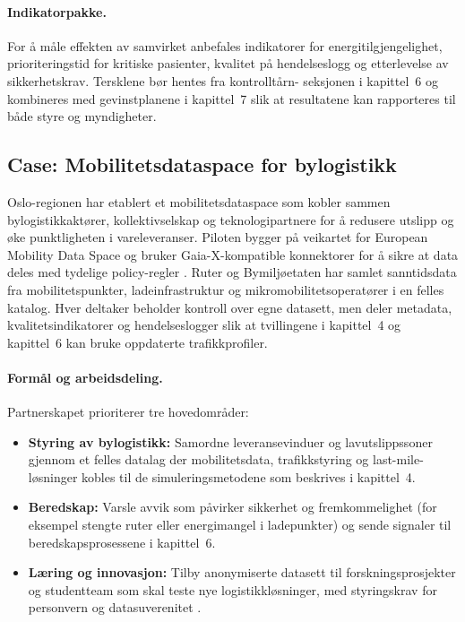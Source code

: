 \paragraph{Indikatorpakke.} For å måle effekten av samvirket anbefales indikatorer for energitilgjengelighet, prioriteringstid
for kritiske pasienter, kvalitet på hendelseslogg og etterlevelse av sikkerhetskrav. Tersklene bør hentes fra kontrolltårn-
seksjonen i kapittel~6 og kombineres med gevinstplanene i kapittel~7 slik at resultatene kan rapporteres til både styre og
myndigheter.

\subsection{Case: Mobilitetsdataspace for bylogistikk}
Oslo-regionen har etablert et mobilitetsdataspace som kobler sammen bylogistikkaktører, kollektivselskap og teknologipartnere
for å redusere utslipp og øke punktligheten i vareleveranser. Piloten bygger på veikartet for European Mobility Data Space og
bruker Gaia-X-kompatible konnektorer for å sikre at data deles med tydelige policy-regler \citep{ec2023mobilitydataspaceblueprint}.
Ruter og Bymiljøetaten har samlet sanntidsdata fra mobilitetspunkter, ladeinfrastruktur og mikromobilitetsoperatører i en
felles katalog. Hver deltaker beholder kontroll over egne datasett, men deler metadata, kvalitetsindikatorer og hendelseslogger
slik at tvillingene i kapittel~4 og kapittel~6 kan bruke oppdaterte trafikkprofiler.

\paragraph{Formål og arbeidsdeling.} Partnerskapet prioriterer tre hovedområder:
\begin{itemize}
    \item \textbf{Styring av bylogistikk:} Samordne leveransevinduer og lavutslippssoner gjennom et felles datalag der
    mobilitetsdata, trafikkstyring og last-mile-løsninger kobles til de simuleringsmetodene som beskrives i kapittel~4.
    \item \textbf{Beredskap:} Varsle avvik som påvirker sikkerhet og fremkommelighet (for eksempel stengte ruter eller
    energimangel i ladepunkter) og sende signaler til beredskapsprosessene i kapittel~6.
    \item \textbf{Læring og innovasjon:} Tilby anonymiserte datasett til forskningsprosjekter og studentteam som skal teste nye
    logistikkløsninger, med styringskrav for personvern og datasuverenitet \citep{ruter2023dataplattform}.
\end{itemize}

